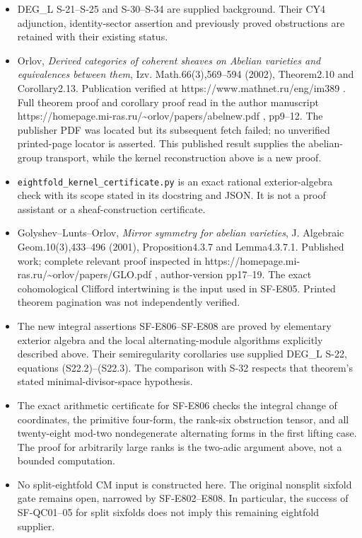 \begin{itemize}
\item
  DEG\_L S-21--S-25 and S-30--S-34 are supplied background. Their CY4
  adjunction, identity-sector assertion and previously proved
  obstructions are retained with their existing status.
\item
  Orlov, \emph{Derived categories of coherent sheaves on Abelian
  varieties and equivalences between them}, Izv. Math.66(3),569--594
  (2002), Theorem2.10 and Corollary2.13. Publication verified at
  https://www.mathnet.ru/eng/im389 . Full theorem proof and corollary
  proof read in the author manuscript
  https://homepage.mi-ras.ru/\textasciitilde orlov/papers/abelnew.pdf ,
  pp9--12. The publisher PDF was located but its subsequent fetch
  failed; no unverified printed-page locator is asserted. This published
  result supplies the abelian-group transport, while the kernel
  reconstruction above is a new proof.
\item
  \texttt{eightfold\_kernel\_certificate.py} is an exact rational
  exterior-algebra check with its scope stated in its docstring and
  JSON. It is not a proof assistant or a sheaf-construction certificate.
\item
  Golyshev--Lunts--Orlov, \emph{Mirror symmetry for abelian varieties},
  J. Algebraic Geom.10(3),433--496 (2001), Proposition4.3.7 and
  Lemma4.3.7.1. Published work; complete relevant proof inspected in
  https://homepage.mi-ras.ru/\textasciitilde orlov/papers/GLO.pdf ,
  author-version pp17--19. The exact cohomological Clifford intertwining
  is the input used in SF-E805. Printed theorem pagination was not
  independently verified.
\item
  The new integral assertions SF-E806--SF-E808 are proved by elementary
  exterior algebra and the local alternating-module algorithms
  explicitly described above. Their semiregularity corollaries use
  supplied DEG\_L S-22, equations (S22.2)--(S22.3). The comparison with
  S-32 respects that theorem's stated minimal-divisor-space hypothesis.
\item
  The exact arithmetic certificate for SF-E806 checks the integral
  change of coordinates, the primitive four-form, the rank-six
  obstruction tensor, and all twenty-eight mod-two nondegenerate
  alternating forms in the first lifting case. The proof for arbitrarily
  large ranks is the two-adic argument above, not a bounded computation.
\item
  No split-eightfold CM input is constructed here. The original nonsplit
  sixfold gate remains open, narrowed by SF-E802--E808. In particular,
  the success of SF-QC01--05 for split sixfolds does not imply this
  remaining eightfold supplier.
\end{itemize}
